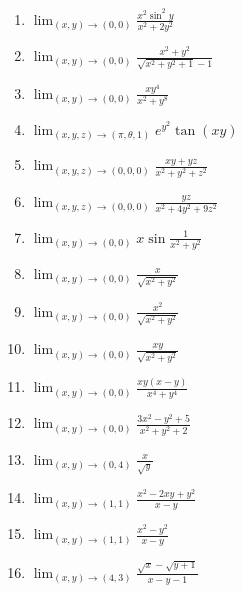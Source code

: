 \documentclass[11pt,a4paper]{article}
\newcommand{\limite}{\displaystyle\lim}
\begin{document}
\begin{enumerate}
\begin{enumerate}
		
		\item $\limite_{(x,y) \to (0,0)} \displaystyle\frac{x^2\sin^2 y}{x^2 + 2y^2}$	
		\item $\limite_{(x,y) \to (0,0)} \displaystyle\frac{x^2 + y^2}{\sqrt{x^2 + y^2 + 1} - 1}$	
		\item $\limite_{(x,y) \to (0,0)} \displaystyle\frac{xy^4}{x^2 + y^8}$	
		\item $\limite_{(x,y,z) \to (\pi,\theta, 1)} e^{y^2}\tan (xy)$	
		\item $\limite_{(x,y,z) \to (0,0,0)} \displaystyle\frac{xy + yz}{x^2 + y^2 + z^2}$	
		\item $\limite_{(x,y,z) \to (0,0,0)} \displaystyle\frac{yz}{x^2 + 4y^2 + 9z^2}$	
		\item $\limite_{(x,y) \to (0,0)} x\sin \displaystyle\frac{1}{x^2 + y^2}$	
		\item $\limite_{(x,y) \to (0,0)} \displaystyle\frac{x}{\sqrt{x^2 + y^2}}$
		
		
		
		
		
		
		
		
		
		
		
		
		
		
		
		
		
		
		
			
		\item $\limite_{(x,y) \to (0,0)} \displaystyle\frac{x^2}{\sqrt{x^2 + y^2}}$	
		\item $\limite_{(x,y) \to (0,0)} \displaystyle\frac{xy}{\sqrt{x^2 + y^2}}$
		\item $\limite_{(x,y) \to (0,0)} \displaystyle\frac{xy(x-y)}{x^4 + y^4}$	
		\item $\limite_{(x,y) \to (0,0)} \displaystyle\frac{3x^2 - y^2 + 5}{x^2 + y^2 + 2}$	
		\item $\limite_{(x,y) \to (0,4)} \displaystyle\frac{x}{\sqrt{y}}$	
		\item $\limite_{(x,y) \to (1,1)} \displaystyle\frac{x^2 - 2xy + y^2}{x - y}$
		\item $\limite_{(x,y) \to (1,1)} \displaystyle\frac{x^2 - y^2}{x - y}$	
		\item $\limite_{(x,y) \to (4,3)} \displaystyle\frac{\sqrt{x} - \sqrt{y + 1}}{x - y - 1}$
			
	\end{enumerate}
	
	
	
	
	

\end{enumerate}
\end{document}
